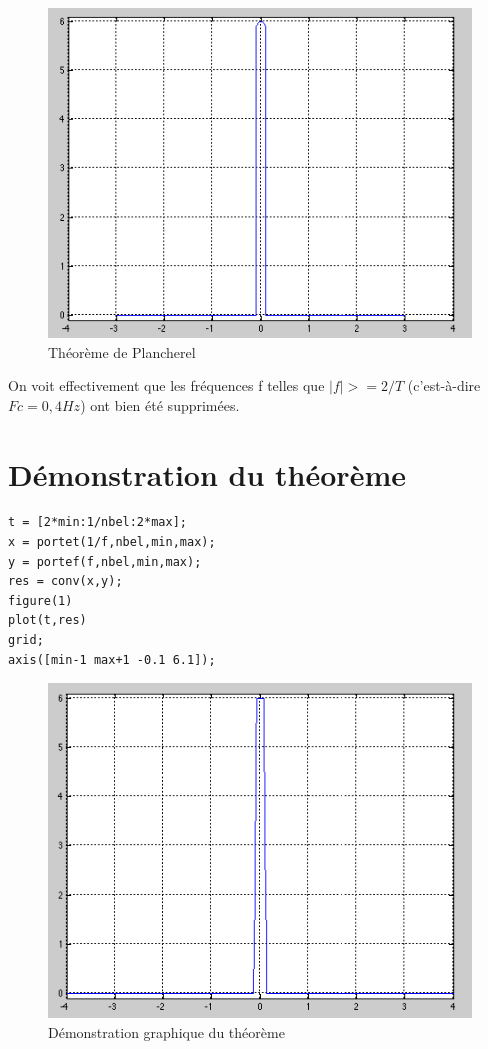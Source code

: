 \documentclass[a4paper, oneside]{report}
\begin{document}
		 \begin{figure}[h]
		   \centering
		    \includegraphics[scale=0.70]{images/plancherela.png}
		    \caption{Th\'eor\`eme de Plancherel}
		  \end{figure}

On voit effectivement que les fr\'equences f telles que $| f | >= 2/T$ (c'est-\`a-dire $Fc=0,4Hz$) ont bien \'et\'e supprim\'ees.
		\section{D\'emonstration du th\'eor\`eme}
		
\begin{lstlisting}
t = [2*min:1/nbel:2*max];
x = portet(1/f,nbel,min,max);
y = portef(f,nbel,min,max);
res = conv(x,y);
figure(1)
plot(t,res)
grid;
axis([min-1 max+1 -0.1 6.1]);
\end{lstlisting}
		
		 \begin{figure}[h]
		   \centering
		    \includegraphics[scale=0.75]{images/plancherelb.png}
		    \caption{D\'emonstration graphique du th\'eor\`eme}
		  \end{figure}
\end{document}
